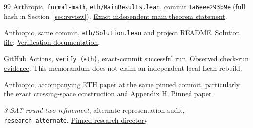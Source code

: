 \begin{thebibliography}{99}
Anthropic, \texttt{formal-math}, \texttt{eth/MainResults.lean}, commit
\texttt{1a6eee293b9e} (full hash in Section~\ref{sec:review}).
\href{https://github.com/anthropics/formal-math/blob/1a6eee293b9e00cb432eef6018a21f523623a9af/eth/MainResults.lean}{Exact independent main theorem statement}.

Anthropic, same commit, \texttt{eth/Solution.lean} and project README.
\href{https://github.com/anthropics/formal-math/blob/1a6eee293b9e00cb432eef6018a21f523623a9af/eth/Solution.lean}{Solution file};
\href{https://github.com/anthropics/formal-math/blob/1a6eee293b9e00cb432eef6018a21f523623a9af/eth/README.md}{Verification documentation}.

GitHub Actions, \texttt{verify (eth)}, exact-commit successful run.
\href{https://github.com/anthropics/formal-math/actions/runs/40440389861/job/121979112896}{Observed check-run evidence}.
This memorandum does not claim an independent local Lean rebuild.

Anthropic, accompanying ETH paper at the same pinned commit, particularly
the exact crossing-space construction and Appendix H.
\href{https://github.com/anthropics/formal-math/blob/1a6eee293b9e00cb432eef6018a21f523623a9af/eth/paper.pdf}{Pinned paper}.

\emph{3-SAT round-two refinement}, alternate representation audit,
\texttt{research\_alternate}.
\href{https://github.com/VladimirReshetnikov/ProveIt/tree/8e76d515063c4b9fbd8743a846b457e3a01bc039/Computability/SubexponentialSAT/Research/3sat_round2_refinement/research_alternate}{Pinned research directory}.
\end{thebibliography}
